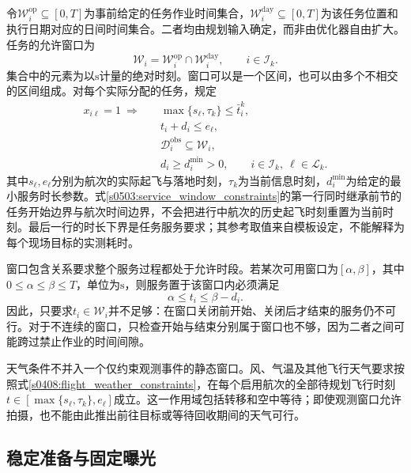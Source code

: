 令$\mathcal W_i^{\mathrm{op}}\subseteq[0,T]$为事前给定的任务作业时间集合，$\mathcal W_i^{\mathrm{day}}\subseteq[0,T]$为该任务位置和执行日期对应的日间时间集合。二者均由规划输入确定，而非由优化器自由扩大。任务的允许窗口为
\begin{equation}
 \mathcal W_i=\mathcal W_i^{\mathrm{op}}\cap\mathcal W_i^{\mathrm{day}},
 \qquad i\in\mathcal I_k.
 \label{s0503:window_definition}
\end{equation}
集合中的元素为以$\mathrm{s}$计量的绝对时刻。窗口可以是一个区间，也可以由多个不相交的区间组成。对每个实际分配的任务，规定
\begin{equation}
 \begin{split}
 x_{i\ell}=1\ \Longrightarrow\quad
 &\max\{s_\ell,\tau_k\}\le\bar t_i^k,\\
 &t_i+d_i\le e_\ell,\\
 &\mathcal D_i^{\mathrm{obs}}\subseteq\mathcal W_i,\\
 &d_i\ge d_i^{\min}>0,
 \qquad i\in\mathcal I_k,\ \ell\in\mathcal L_k.
 \end{split}
 \label{s0503:service_window_constraints}
\end{equation}
其中$s_\ell,e_\ell$分别为航次的实际起飞与落地时刻，$\tau_k$为当前信息时刻，$d_i^{\min}$为给定的最小服务时长参数。式\eqref{s0503:service_window_constraints}的第一行同时继承前节的任务开始边界与航次时间边界，不会把进行中航次的历史起飞时刻重置为当前时刻。最后一行的时长下界是任务服务要求；其参考取值来自模板设定，不能解释为每个现场目标的实测耗时。

窗口包含关系要求整个服务过程都处于允许时段。若某次可用窗口为$[\alpha,\beta]$，其中$0\le\alpha\le\beta\le T$，单位为$\mathrm{s}$，则服务置于该窗口内必须满足
\begin{equation}
 \alpha\le t_i\le\beta-d_i.
 \label{s0503:single_window_start}
\end{equation}
因此，只要求$t_i\in\mathcal W_i$并不足够：在窗口关闭前开始、关闭后才结束的服务仍不可行。对于不连续的窗口，只检查开始与结束分别属于窗口也不够，因为二者之间可能跨过禁止作业的时间间隙。

天气条件不并入一个仅约束观测事件的静态窗口。风、气温及其他飞行天气要求按照式\eqref{s0408:flight_weather_constraints}，在每个启用航次的全部待规划飞行时刻$t\in[\max\{s_\ell,\tau_k\},e_\ell]$成立。这一作用域包括转移和空中等待；即使观测窗口允许拍摄，也不能由此推出前往目标或等待回收期间的天气可行。

\subsection{稳定准备与固定曝光}

